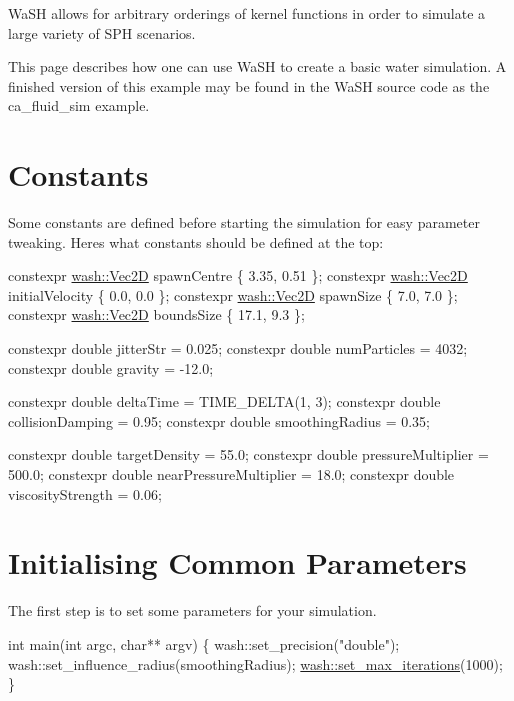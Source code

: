Wa\+SH allows for arbitrary orderings of kernel functions in order to simulate a large variety of S\+PH scenarios.

This page describes how one can use Wa\+SH to create a basic water simulation. A finished version of this example may be found in the Wa\+SH source code as the {\ttfamily ca\+\_\+fluid\+\_\+sim} example.

\section*{Constants}

Some constants are defined before starting the simulation for easy parameter tweaking. Here\textquotesingle{}s what constants should be defined at the top\+: 
\begin{DoxyCode}
constexpr \mbox{\hyperlink{classwash_1_1Vec}{wash::Vec2D}} spawnCentre \{ 3.35, 0.51 \};
constexpr \mbox{\hyperlink{classwash_1_1Vec}{wash::Vec2D}} initialVelocity \{ 0.0, 0.0 \};
constexpr \mbox{\hyperlink{classwash_1_1Vec}{wash::Vec2D}} spawnSize \{ 7.0, 7.0 \};
constexpr \mbox{\hyperlink{classwash_1_1Vec}{wash::Vec2D}} boundsSize \{ 17.1, 9.3 \};

constexpr \textcolor{keywordtype}{double} jitterStr = 0.025;
constexpr \textcolor{keywordtype}{double} numParticles = 4032;
constexpr \textcolor{keywordtype}{double} gravity = -12.0;

constexpr \textcolor{keywordtype}{double} deltaTime = TIME\_DELTA(1, 3);
constexpr \textcolor{keywordtype}{double} collisionDamping = 0.95;
constexpr \textcolor{keywordtype}{double} smoothingRadius = 0.35;

constexpr \textcolor{keywordtype}{double} targetDensity = 55.0;
constexpr \textcolor{keywordtype}{double} pressureMultiplier = 500.0;
constexpr \textcolor{keywordtype}{double} nearPressureMultiplier = 18.0;
constexpr \textcolor{keywordtype}{double} viscosityStrength = 0.06;
\end{DoxyCode}


\section*{Initialising Common Parameters}

The first step is to set some parameters for your simulation.


\begin{DoxyCode}
\textcolor{keywordtype}{int} main(\textcolor{keywordtype}{int} argc, \textcolor{keywordtype}{char}** argv) \{
    wash::set\_precision(\textcolor{stringliteral}{"double"});
    wash::set\_influence\_radius(smoothingRadius);
    \mbox{\hyperlink{namespacewash_aeb7b287406244c8ab192d0524ad4da5b}{wash::set\_max\_iterations}}(1000);
\}
\end{DoxyCode}


